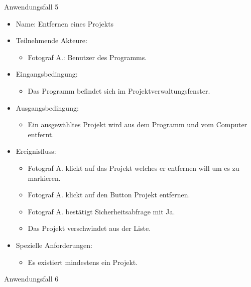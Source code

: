 	\begin{description}
		\item[Anwendungsfall 5]
	\end{description}
	
		\begin{itemize}
			\item Name: Entfernen eines Projekts
			\item Teilnehmende Akteure:
			\begin{itemize}
				\item	Fotograf A.: Benutzer des Programms.	
			\end{itemize}
			\item Eingangsbedingung:
			\begin{itemize}
				\item	Das Programm befindet sich im Projektverwaltungsfenster.		
			\end{itemize}
			\item Ausgangsbedingung:
			\begin{itemize}
				\item	Ein ausgewähltes Projekt wird aus dem Programm und vom Computer entfernt.		
			\end{itemize}
			\item Ereignisfluss:
			\begin{itemize}
				\item Fotograf A. klickt auf das Projekt welches er entfernen will um es zu markieren.
				\item Fotograf A. klickt auf den Button Projekt entfernen.
				\item Fotograf A.	bestätigt Sicherheitsabfrage mit Ja.
				\item Das Projekt verschwindet aus der Liste.
			\end{itemize}
			\item Spezielle Anforderungen:
			\begin{itemize}
				\item	Es existiert mindestens ein Projekt.		
			\end{itemize}			
		\end{itemize}
		
		\begin{description}
			\item[Anwendungsfall 6]
		\end{description}
		
